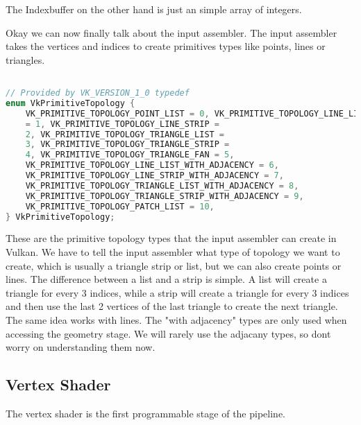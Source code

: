 \documentclass[12pt]{report} \usepackage {preamble}
\begin{document}
The Indexbuffer on the other hand is just an simple array of integers.
\cite{vulkan-tutorial-index-buffer}

Okay we can now finally talk about the input assembler. The input
assembler takes the vertices and indices to create primitives types like
points, lines or triangles. \cite{microsoft-ia}

\newpage

\begin{lstlisting}[language=C++] 

// Provided by VK_VERSION_1_0 typedef
enum VkPrimitiveTopology {
    VK_PRIMITIVE_TOPOLOGY_POINT_LIST = 0, VK_PRIMITIVE_TOPOLOGY_LINE_LIST
    = 1, VK_PRIMITIVE_TOPOLOGY_LINE_STRIP =
    2, VK_PRIMITIVE_TOPOLOGY_TRIANGLE_LIST =
    3, VK_PRIMITIVE_TOPOLOGY_TRIANGLE_STRIP =
    4, VK_PRIMITIVE_TOPOLOGY_TRIANGLE_FAN = 5,
    VK_PRIMITIVE_TOPOLOGY_LINE_LIST_WITH_ADJACENCY = 6,
    VK_PRIMITIVE_TOPOLOGY_LINE_STRIP_WITH_ADJACENCY = 7,
    VK_PRIMITIVE_TOPOLOGY_TRIANGLE_LIST_WITH_ADJACENCY = 8,
    VK_PRIMITIVE_TOPOLOGY_TRIANGLE_STRIP_WITH_ADJACENCY = 9,
    VK_PRIMITIVE_TOPOLOGY_PATCH_LIST = 10,
} VkPrimitiveTopology; 

\end{lstlisting} \cite{vulkan-spec-primitive-topology}

These are the primitive topology types that the input assembler can
create in Vulkan.  We have to tell the input assembler what type of
topology we want to create, which is usually a triangle strip or list,
but we can also create points or lines.  The difference between a list
and a strip is simple. A list will create a triangle for every 3 indices,
while a strip will create a triangle for every 3 indices and then use
the last 2 vertices of the last triangle to create the next triangle.
The same idea works with lines. The "with adjacency" types are only
used when accessing the geometry stage. We will rarely use
the adjacany types, so dont worry on understanding them now. \cite{vulkan-spec-primitive-topology}

\subsection {Vertex Shader}

The vertex shader is the first programmable stage of the pipeline.


\printbibliography[
	heading=bibintoc, title={Bibliography}
]

\listoffigures
\end{document}
